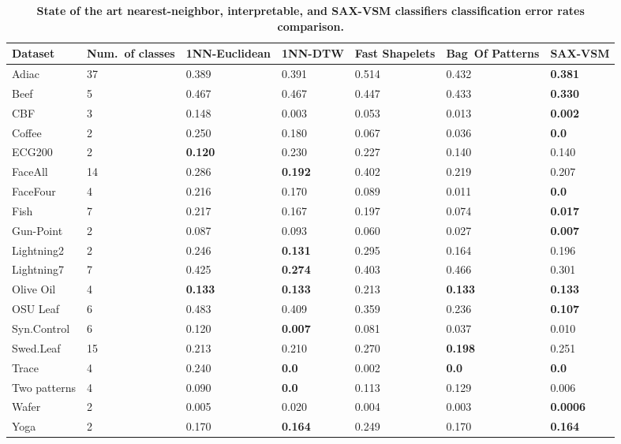 \begin{table}[t!]
\captionsetup{justification=centering}
\caption{\bf State of the art nearest-neighbor, interpretable, and \mbox{SAX-VSM} classifiers classification error rates comparison.}
 \label{perf_table1}
{\setlength{\extrarowheight}{1.5pt}%
{\footnotesize
\begin{tabularx}{\linewidth}{@{} l *6X @{}}
\hline
Dataset & \mbox{Num. of} classes & 1NN-Euclidean & 1NN-DTW & Fast Shapelets &  \mbox{Bag Of} \mbox{Patterns}
& SAX-VSM\\
\hline
Adiac        &37  & 0.389   & 0.391  & 0.514  & 0.432  & \textbf{0.381}\\
Beef         &5   & 0.467   & 0.467  & 0.447  & 0.433  & \textbf{0.330}\\
CBF         & 3  & 0.148    & 0.003  & 0.053    & 0.013 & \textbf{0.002} \\
Coffee       &2    & 0.250   & 0.180  & 0.067     & 0.036     & \textbf{0.0} \\
ECG200     &2   & \textbf{0.120}  & 0.230  & 0.227     & 0.140   & 0.140 \\
FaceAll      &14  & 0.286   & \textbf{0.192}  & 0.402     & 0.219   & 0.207\\
FaceFour    &4   & 0.216   & 0.170  & 0.089     & 0.011   & \textbf{0.0} \\
Fish         &7   & 0.217   & 0.167  & 0.197    & 0.074   & \textbf{0.017} \\
Gun-Point    &2   & 0.087   & 0.093  & 0.060     & 0.027     & \textbf{0.007} \\
Lightning2    &2   & 0.246   & \textbf{0.131}  & 0.295  & 0.164  & 0.196 \\
Lightning7    &7   & 0.425   & \textbf{0.274}  & 0.403  & 0.466  & 0.301 \\
Olive Oil     &4   & \textbf{0.133}   & \textbf{0.133}  & 0.213     & \textbf{0.133}  & \textbf{0.133}\\
OSU Leaf    &6   & 0.483   & 0.409  & 0.359     & 0.236  & \textbf{0.107} \\
Syn.Control  &6   & 0.120   & \textbf{0.007}  & 0.081     & 0.037  & 0.010 \\
Swed.Leaf   &15  & 0.213   & 0.210 & 0.270 & \textbf{0.198} & 0.251 \\
Trace       &4   & 0.240   & \textbf{0.0}    & 0.002  & \textbf{0.0} & \textbf{0.0} \\
Two patterns &4   & 0.090   & \textbf{0.0}    & 0.113   & 0.129      & 0.006 \\
Wafer        &2    & 0.005   & 0.020     & 0.004  & 0.003 & \textbf{0.0006} \\
Yoga        &2    & 0.170   & \textbf{0.164}  & 0.249 & 0.170 & \textbf{0.164} \\
\hline
\end{tabularx}
}}
\end{table}

